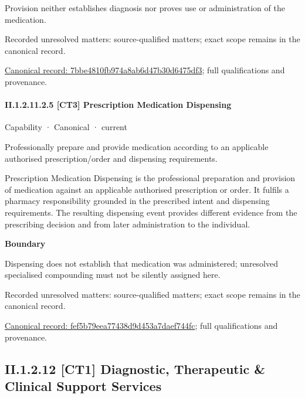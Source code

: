 Provision neither establishes diagnosis nor proves use or administration of the medication.


{\small Recorded unresolved matters: source-qualified matters; exact scope remains in the canonical record.}\par
{\footnotesize \href{../../../../continuum/strategy/capability/7bbe4810fb974a8ab6d47b30d6475df3.md}{Canonical record: 7bbe4810fb974a8ab6d47b30d6475df3}; full qualifications and provenance.}\par
\paragraph*{II.1.2.11.2.5 [CT3] Prescription Medication Dispensing}
\label{navigation:II.1.2.11.2.5}

\label{element:fef5b79eea77438d9d453a7daef744fc}
{\small Capability · Canonical · current}\par

Professionally prepare and provide medication according to an applicable authorised prescription/order and dispensing requirements.



Prescription Medication Dispensing is the professional preparation and provision of medication against an applicable authorised prescription or order. It fulfils a pharmacy responsibility grounded in the prescribed intent and dispensing requirements. The resulting dispensing event provides different evidence from the prescribing decision and from later administration to the individual.



\textbf{Boundary}



Dispensing does not establish that medication was administered; unresolved specialised compounding must not be silently assigned here.


{\small Recorded unresolved matters: source-qualified matters; exact scope remains in the canonical record.}\par
{\footnotesize \href{../../../../continuum/strategy/capability/fef5b79eea77438d9d453a7daef744fc.md}{Canonical record: fef5b79eea77438d9d453a7daef744fc}; full qualifications and provenance.}\par
\subsection*{II.1.2.12 [CT1] Diagnostic, Therapeutic \& Clinical Support Services}
\label{navigation:II.1.2.12}

